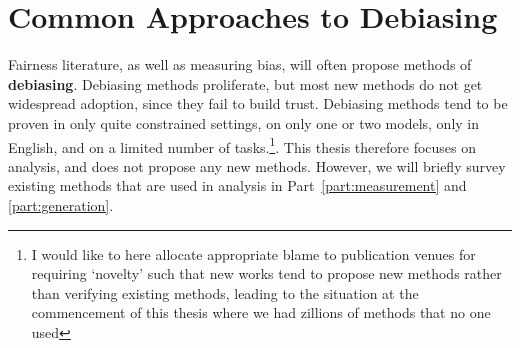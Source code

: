 \section{Common Approaches to Debiasing}
Fairness literature, as well as measuring bias, will often propose methods of \textbf{debiasing}. Debiasing methods proliferate, but most new methods do not get widespread adoption, since they fail to build trust. Debiasing methods tend to be proven in only quite constrained settings, on only one or two models, only in English, and on a limited number of tasks.\footnote{I would like to here allocate appropriate blame to publication venues for requiring `novelty' such that new works tend to propose new methods rather than verifying existing methods, leading to the situation at the commencement of this thesis where we had zillions of methods that no one used}. This thesis therefore focuses on analysis, and does not propose any new methods. However, we will briefly survey existing methods that are used in analysis in Part~\ref{part:measurement} and \ref{part:generation}.

